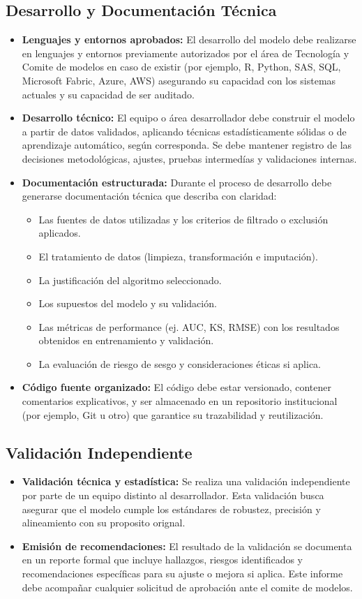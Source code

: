 \documentclass[11pt,oneside]{article}%
\begin{document}
\subsection{Desarrollo y Documentación Técnica}
\begin{itemize}
\item \textbf{Lenguajes y entornos aprobados:} El desarrollo del modelo debe realizarse en lenguajes y entornos previamente autorizados por el área de Tecnología y Comite de modelos en caso de existir (por ejemplo, R, Python, SAS, SQL, Microsoft Fabric, Azure, AWS) asegurando su capacidad con los sistemas actuales y su capacidad de ser auditado.
\item \textbf{Desarrollo técnico:} El equipo o área desarrollador debe construir el modelo a partir de datos validados, aplicando técnicas estadísticamente sólidas o de aprendizaje automático, según corresponda. Se debe mantener registro de las decisiones metodológicas, ajustes, pruebas intermedías y validaciones internas. 
\item \textbf{Documentación estructurada:} Durante el proceso de desarrollo debe generarse documentación técnica que describa con claridad: 
\begin{itemize}
\item Las fuentes de datos utilizadas y los criterios de filtrado o exclusión aplicados. 
\item El tratamiento de datos (limpieza, transformación e imputación).
\item La justificación del algoritmo seleccionado. 
\item Los supuestos del modelo y su validación. 
\item Las métricas de performance (ej. AUC, KS, RMSE) con los resultados obtenidos en entrenamiento y validación. 
\item La evaluación de riesgo de sesgo y consideraciones éticas si aplica. 
\end{itemize}
\item \textbf{Código fuente organizado:} El código debe estar versionado, contener comentarios explicativos, y ser almacenado en un repositorio institucional (por ejemplo, Git u otro) que garantice su trazabilidad y reutilización. 
\end{itemize}
\subsection{Validación Independiente}
\begin{itemize}
\item \textbf{Validación técnica y estadística:} Se realiza una validación independiente por parte de un equipo distinto al desarrollador. Esta validación busca asegurar que el modelo cumple los estándares de robustez, precisión y alineamiento con su proposito orignal. 
\item \textbf{Emisión de recomendaciones:} El resultado de la validación se documenta en un reporte formal que incluye hallazgos, riesgos identificados y recomendaciones específicas para su ajuste o mejora si aplica. Este informe debe acompañar cualquier solicitud de aprobación ante el comite de modelos. 
\end{itemize}
\end{document}
